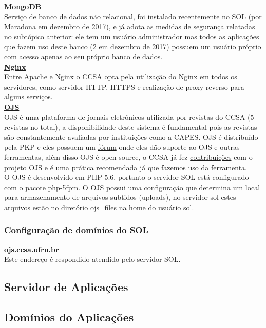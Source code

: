 \documentclass[12pt]{article}
\begin{document}
\textbf{\href{http://mongodb.org/}{MongoDB}}\\
Serviço de banco de dados não relacional, foi instalado recentemente no SOL (por Maradona em dezembro de 2017), e já adota as medidas de segurança relatadas no subtópico anterior: ele tem um usuário administrador mas todos as aplicações que fazem uso deste banco (2 em dezembro de 2017) possuem um usuário próprio com acesso apenas ao seu próprio banco de dados.\\

\textbf{\href{https://nginx.org/en/}{Nginx}}\\
Entre Apache e Nginx o CCSA opta pela utilização do Nginx em todos os servidores, como servidor HTTP, HTTPS e realização de proxy reverso para alguns serviços.\\

\textbf{\href{http://ojs.ccsa.ufrn.br/}{OJS}}\\
OJS é uma plataforma de jornais eletrônicos utilizada por revistas do CCSA (5 revistas no total), a disponibilidade deste sistema é fundamental pois as revistas são constantemente avaliadas por instituições como a CAPES. OJS é distribuído pela PKP e eles possuem um \href{https://forum.pkp.sfu.ca/}{fórum} onde eles dão suporte ao OJS e outras ferramentas, além disso OJS é open-source, o CCSA já fez \href{https://github.com/pkp/pkp-lib/issues?q=author:mrmorais}{contribuições} com o projeto OJS e é uma prática recomendada já que fazemos uso da ferramenta.\\
O OJS é desenvolvido em PHP 5.6, portanto o servidor SOL está configurado com o pacote php-5fpm. O OJS possui uma configuração que determina um local para armazenamento de arquivos subtidos (uploads), no servidor sol estes arquivos estão no diretório \underline{ojs\_files} na home do usuário \underline{sol}.\\

\subsubsection{Configuração de domínios do SOL}
\textbf{\href{http://ojs.ccsa.ufrn.br/}{ojs.ccsa.ufrn.br}}\\
Este endereço é respondido atendido pelo servidor SOL.

\subsection{Servidor de Aplicações}
\subsection{Domínios do Aplicações}
\end{document}
